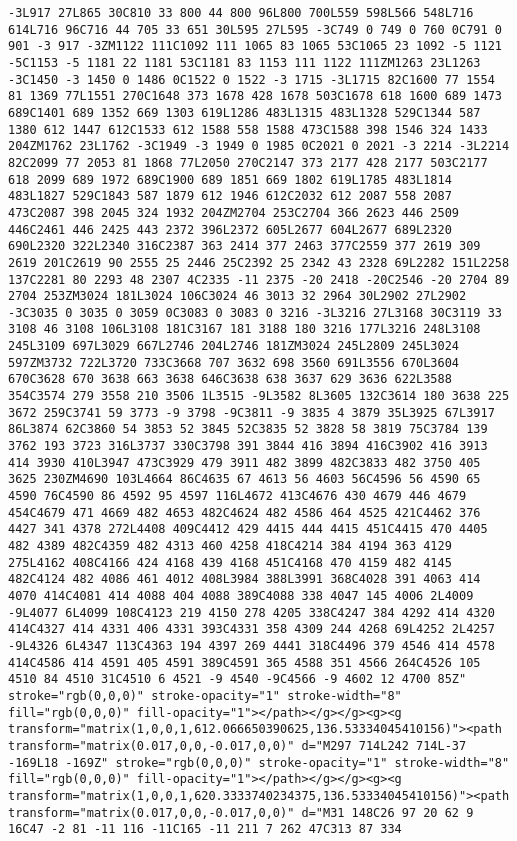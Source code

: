 \documentclass[
]{article}
\begin{document}
\begin{verbatim}
-3L917 27L865 30C810 33 800 44 800 96L800 700L559 598L566 548L716 614L716 96C716 44 705 33 651 30L595 27L595 -3C749 0 749 0 760 0C791 0 901 -3 917 -3ZM1122 111C1092 111 1065 83 1065 53C1065 23 1092 -5 1121 -5C1153 -5 1181 22 1181 53C1181 83 1153 111 1122 111ZM1263 23L1263 -3C1450 -3 1450 0 1486 0C1522 0 1522 -3 1715 -3L1715 82C1600 77 1554 81 1369 77L1551 270C1648 373 1678 428 1678 503C1678 618 1600 689 1473 689C1401 689 1352 669 1303 619L1286 483L1315 483L1328 529C1344 587 1380 612 1447 612C1533 612 1588 558 1588 473C1588 398 1546 324 1433 204ZM1762 23L1762 -3C1949 -3 1949 0 1985 0C2021 0 2021 -3 2214 -3L2214 82C2099 77 2053 81 1868 77L2050 270C2147 373 2177 428 2177 503C2177 618 2099 689 1972 689C1900 689 1851 669 1802 619L1785 483L1814 483L1827 529C1843 587 1879 612 1946 612C2032 612 2087 558 2087 473C2087 398 2045 324 1932 204ZM2704 253C2704 366 2623 446 2509 446C2461 446 2425 443 2372 396L2372 605L2677 604L2677 689L2320 690L2320 322L2340 316C2387 363 2414 377 2463 377C2559 377 2619 309 2619 201C2619 90 2555 25 2446 25C2392 25 2342 43 2328 69L2282 151L2258 137C2281 80 2293 48 2307 4C2335 -11 2375 -20 2418 -20C2546 -20 2704 89 2704 253ZM3024 181L3024 106C3024 46 3013 32 2964 30L2902 27L2902 -3C3035 0 3035 0 3059 0C3083 0 3083 0 3216 -3L3216 27L3168 30C3119 33 3108 46 3108 106L3108 181C3167 181 3188 180 3216 177L3216 248L3108 245L3109 697L3029 667L2746 204L2746 181ZM3024 245L2809 245L3024 597ZM3732 722L3720 733C3668 707 3632 698 3560 691L3556 670L3604 670C3628 670 3638 663 3638 646C3638 638 3637 629 3636 622L3588 354C3574 279 3558 210 3506 1L3515 -9L3582 8L3605 132C3614 180 3638 225 3672 259C3741 59 3773 -9 3798 -9C3811 -9 3835 4 3879 35L3925 67L3917 86L3874 62C3860 54 3853 52 3845 52C3835 52 3828 58 3819 75C3784 139 3762 193 3723 316L3737 330C3798 391 3844 416 3894 416C3902 416 3913 414 3930 410L3947 473C3929 479 3911 482 3899 482C3833 482 3750 405 3625 230ZM4690 103L4664 86C4635 67 4613 56 4603 56C4596 56 4590 65 4590 76C4590 86 4592 95 4597 116L4672 413C4676 430 4679 446 4679 454C4679 471 4669 482 4653 482C4624 482 4586 464 4525 421C4462 376 4427 341 4378 272L4408 409C4412 429 4415 444 4415 451C4415 470 4405 482 4389 482C4359 482 4313 460 4258 418C4214 384 4194 363 4129 275L4162 408C4166 424 4168 439 4168 451C4168 470 4159 482 4145 482C4124 482 4086 461 4012 408L3984 388L3991 368C4028 391 4063 414 4070 414C4081 414 4088 404 4088 389C4088 338 4047 145 4006 2L4009 -9L4077 6L4099 108C4123 219 4150 278 4205 338C4247 384 4292 414 4320 414C4327 414 4331 406 4331 393C4331 358 4309 244 4268 69L4252 2L4257 -9L4326 6L4347 113C4363 194 4397 269 4441 318C4496 379 4546 414 4578 414C4586 414 4591 405 4591 389C4591 365 4588 351 4566 264C4526 105 4510 84 4510 31C4510 6 4521 -9 4540 -9C4566 -9 4602 12 4700 85Z" stroke="rgb(0,0,0)" stroke-opacity="1" stroke-width="8" fill="rgb(0,0,0)" fill-opacity="1"></path></g></g><g><g transform="matrix(1,0,0,1,612.066650390625,136.53334045410156)"><path transform="matrix(0.017,0,0,-0.017,0,0)" d="M297 714L242 714L-37 -169L18 -169Z" stroke="rgb(0,0,0)" stroke-opacity="1" stroke-width="8" fill="rgb(0,0,0)" fill-opacity="1"></path></g></g><g><g transform="matrix(1,0,0,1,620.3333740234375,136.53334045410156)"><path transform="matrix(0.017,0,0,-0.017,0,0)" d="M31 148C26 97 20 62 9 16C47 -2 81 -11 116 -11C165 -11 211 7 262 47C313 87 334 
\end{verbatim}
\end{document}
